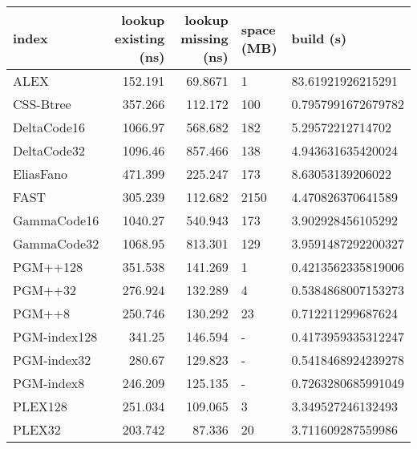 \begin{tabular}{lrrll}
\hline
 index             &   lookup existing (ns) &   lookup missing (ns) & space (MB)   & build (s)             \\
\hline
 ALEX              &               152.191  &               69.8671 & 1            & 83.61921926215291     \\
 CSS-Btree         &               357.266  &              112.172  & 100          & 0.7957991672679782    \\
 DeltaCode16       &              1066.97   &              568.682  & 182          & 5.29572212714702      \\
 DeltaCode32       &              1096.46   &              857.466  & 138          & 4.943631635420024     \\
 EliasFano         &               471.399  &              225.247  & 173          & 8.63053139206022      \\
 FAST              &               305.239  &              112.682  & 2150         & 4.470826370641589     \\
 GammaCode16       &              1040.27   &              540.943  & 173          & 3.902928456105292     \\
 GammaCode32       &              1068.95   &              813.301  & 129          & 3.9591487292200327    \\
 PGM++128          &               351.538  &              141.269  & 1            & 0.4213562335819006    \\
 PGM++32           &               276.924  &              132.289  & 4            & 0.5384868007153273    \\
 PGM++8            &               250.746  &              130.292  & 23           & 0.712211299687624     \\
 PGM-index128      &               341.25   &              146.594  & -            & 0.4173959335312247    \\
 PGM-index32       &               280.67   &              129.823  & -            & 0.5418468924239278    \\
 PGM-index8        &               246.209  &              125.135  & -            & 0.7263280685991049    \\
 PLEX128           &               251.034  &              109.065  & 3            & 3.349527246132493     \\
 PLEX32            &               203.742  &               87.336  & 20           & 3.711609287559986     \\

\end{tabular}
